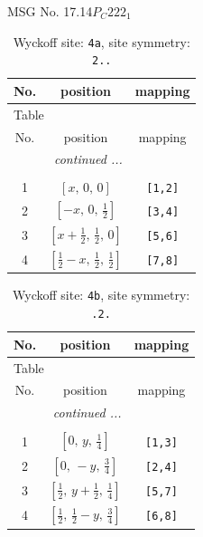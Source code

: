 \documentclass[fleqn,8pt]{jsarticle}
\begin{document}
\setcounter{MaxMatrixCols}{32}

\renewcommand{\tablename}{Table~}
\renewcommand{\figurename}{Figure~}
\begin{center}
\LARGE
MSG No. 17.14\quad$P_{C}222_{1}$
\end{center}
\renewcommand{\arraystretch}{1.2}
\begin{longtable}{ccc}
\caption{Wyckoff site: {\tt 4a}, site symmetry: {\tt 2..}}
 \\
 \hline \hline
No. & position & mapping \\ \hline \endfirsthead

\multicolumn{2}{l}{\tablename\ \thetable{}} \\
 \hline \hline
No. & position & mapping \\ \hline \endhead

 \hline \hline
\multicolumn{2}{r}{\footnotesize\it continued ...} \\ \endfoot

 \hline \hline
\multicolumn{2}{r}{} \\ \endlastfoot

1 & $\left[ x,\, 0,\, 0 \right]$ & {\tt [1,2]} \\ \hline
2 & $\left[ - x,\, 0,\, \frac{1}{2} \right]$ & {\tt [3,4]} \\ \hline
3 & $\left[ x + \frac{1}{2},\, \frac{1}{2},\, 0 \right]$ & {\tt [5,6]} \\ \hline
4 & $\left[ \frac{1}{2} - x,\, \frac{1}{2},\, \frac{1}{2} \right]$ & {\tt [7,8]} \\
\end{longtable}
\renewcommand{\arraystretch}{1.2}
\begin{longtable}{ccc}
\caption{Wyckoff site: {\tt 4b}, site symmetry: {\tt .2.}}
 \\
 \hline \hline
No. & position & mapping \\ \hline \endfirsthead

\multicolumn{2}{l}{\tablename\ \thetable{}} \\
 \hline \hline
No. & position & mapping \\ \hline \endhead

 \hline \hline
\multicolumn{2}{r}{\footnotesize\it continued ...} \\ \endfoot

 \hline \hline
\multicolumn{2}{r}{} \\ \endlastfoot

1 & $\left[ 0,\, y,\, \frac{1}{4} \right]$ & {\tt [1,3]} \\ \hline
2 & $\left[ 0,\, - y,\, \frac{3}{4} \right]$ & {\tt [2,4]} \\ \hline
3 & $\left[ \frac{1}{2},\, y + \frac{1}{2},\, \frac{1}{4} \right]$ & {\tt [5,7]} \\ \hline
4 & $\left[ \frac{1}{2},\, \frac{1}{2} - y,\, \frac{3}{4} \right]$ & {\tt [6,8]} \\
\end{longtable}
\end{document}
